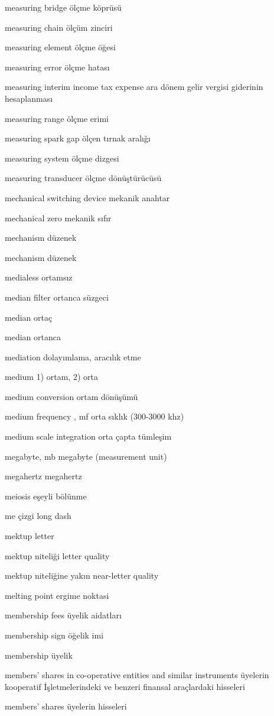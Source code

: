 \documentclass[12pt,fleqn]{article}\usepackage{../../common}
\begin{document}
measuring bridge ölçme köprüsü

measuring chain ölçüm zinciri

measuring element ölçme öğesi

measuring error ölçme hatası

measuring interim income tax expense ara dönem gelir vergisi giderinin hesaplanması

measuring range ölçme erimi

measuring spark gap ölçen tırnak aralığı

measuring system ölçme dizgesi

measuring transducer ölçme dönüştürücüsü

mechanical switching device mekanik anahtar

mechanical zero mekanik sıfır

mechanism düzenek

mechanism düzenek

medialess ortamsız

median filter ortanca süzgeci

median ortaç

median ortanca

mediation dolayımlama, aracılık etme

medium 1) ortam, 2) orta

medium conversion ortam dönüşümü

medium frequency , mf orta sıklık (300-3000 khz)

medium scale integration orta çapta tümleşim

megabyte, mb megabyte (measurement unit)

megahertz megahertz

meiosis eşeyli bölünme

me çizgi long dash

mektup letter

mektup niteliği letter quality

mektup niteliğine yakın near-letter quality

melting point ergime noktasi

membership fees üyelik aidatları

membership sign öğelik imi

membership üyelik

members' shares in co-operative entities and similar instruments üyelerin kooperatif İşletmelerindeki ve benzeri finansal araçlardaki hisseleri

members' shares üyelerin hisseleri
\end{document}
